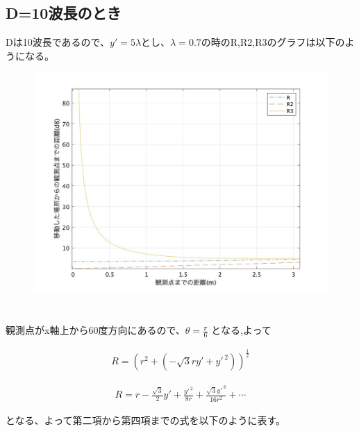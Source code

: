 \documentclass[dvipdfmx,autodetect-engine,titlepage]{jsarticle}
\begin{document}
\subsection{D=10波長のとき}
Dは10波長であるので、\begin{math} y'=5\lambda\end{math}とし、\begin{math}
  \lambda = 0.7\end{math}の時のR,R2,R3のグラフは以下のようになる。

\begin{figure}[h]
  \centering
  \includegraphics[scale=0.3]{week4_2.jpg}
  \caption{}
\end{figure}

\section{}

観測点がx軸上から60度方向にあるので、\begin{math} \theta = \frac{\pi}{6} \end{math}
となる,よって

\begin{align*}
  R = (r^2 + (-\sqrt{3}ry'+y'^{\,2}))^{\frac{1}{2}}
\end{align*}

\begin{align*}
  R = r - \frac{\sqrt{3}}{2}y' + \frac{y'^{\,2}}{8r} + \frac{\sqrt{3}y'^{\,3}}{16r^2} + \cdots
\end{align*}

となる、よって第二項から第四項までの式を以下のように表す。
\end{document}
